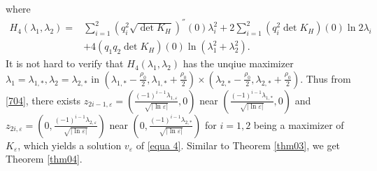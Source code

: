 \documentclass[12pt,reqno]{amsart}
\numberwithin{equation}{section}
\theoremstyle{definition}
\theoremstyle{remark}
\begin{document}
where
\begin{equation*} 
\begin{split}
H_4(\lambda_1,\lambda_2)=&\sum_{i=1}^2 \left(q_i^2\sqrt{\det K_H} \right)^{''}(0 )\lambda_i^2+2\sum_{i=1}^2\left( q_i^2 \det K_H\right)(0)\ln 2\lambda_i\\
& +4\left( q_1q_2  \det K_H\right)(0)\ln (\lambda_1^2+\lambda_2^2) .
\end{split}
\end{equation*}
$$$$
It is not hard to verify that 	$ H_4(\lambda_1,\lambda_2) $
	has the unqiue maximizer $ \lambda_1=\lambda_{1,*}, \lambda_2=\lambda_{2,*} $ in $  \left( \lambda_{1,*}-\frac{\rho_0}{2}, \lambda_{1,*}+\frac{\rho_0}{2}\right)\times \left( \lambda_{2,*}-\frac{\rho_0}{2}, \lambda_{2,*}+\frac{\rho_0}{2}\right) $.   
%
Thus from \eqref{704}, there exists $ z_{2i-1,\varepsilon}=\left( \frac{(-1)^{i-1}\lambda_{1,\varepsilon}}{\sqrt{|\ln\varepsilon|}},0\right)  $ near $ \left( \frac{(-1)^{i-1}\lambda_{1,*}}{\sqrt{|\ln\varepsilon|}},0\right) $ and $ z_{2i,\varepsilon}=\left( 0,\frac{(-1)^{i-1}\lambda_{2,\varepsilon}}{\sqrt{|\ln\varepsilon|}}\right)  $ near $ \left( 0,\frac{(-1)^{i-1}\lambda_{2,*}}{\sqrt{|\ln\varepsilon|}}\right) $ for $ i=1,2 $ being a maximizer of $ K_\varepsilon  $, which yields a solution $ v_\varepsilon $ of \eqref{equa 4}.   Similar to Theorem \ref{thm03}, we get Theorem \ref{thm04}.
\end{document}
